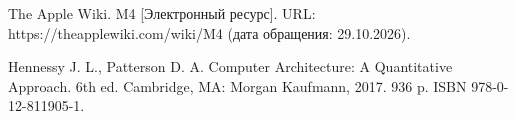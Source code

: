 \newpage
{} \par

\begin{thebibliography}{}
     The Apple Wiki. M4 [Электронный ресурс]. URL: https://theapplewiki.com/wiki/M4 (дата обращения: 29.10.2026).

     Hennessy J. L., Patterson D. A. Computer Architecture: A Quantitative Approach. 6th ed. Cambridge, MA: Morgan Kaufmann, 2017. 936 p. ISBN 978-0-12-811905-1.
\end{thebibliography}
